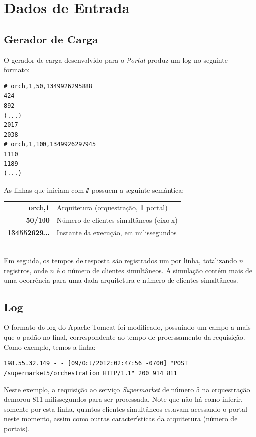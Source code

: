 \documentclass[brazil, a4paper,12pt]{article}
\begin{document}
\section{Dados de Entrada}

\subsection{Gerador de Carga}
O gerador de carga desenvolvido para o \emph{Portal} produz um log no seguinte formato:

\begin{verbatim}
# orch,1,50,1349926295888
424
892
(...)
2017
2038
# orch,1,100,1349926297945
1110
1189
(...)
\end{verbatim}

As linhas que iniciam com \verb/#/ possuem a seguinte semântica:\\

\begin{tabular}{r l}
  {\bf orch,1} & Arquitetura (orquestração, {\bf1} portal)\\
  {\bf 50/100} & Número de clientes simultâneos (eixo x)\\
  {\bf 134552629...} & Instante da execução, em milissegundos
\end{tabular}
\\

Em seguida, os tempos de resposta são registrados um por linha, totalizando $n$ registros, onde $n$ é o número de clientes simultâneos. A simulação contém mais de uma ocorrência para uma dada arquitetura e número de clientes simultâneos.

\subsection{Log}
  O formato do log do Apache Tomcat foi modificado, possuindo um campo a mais que o padão no final, correspondente ao tempo de processamento da requisição. Como exemplo, temos a linha:

\begin{verbatim}
198.55.32.149 - - [09/Oct/2012:02:47:56 -0700] "POST
/supermarket5/orchestration HTTP/1.1" 200 914 811
\end{verbatim}

Neste exemplo, a requisição ao serviço \emph{Supermarket} de número 5 na orquestração demorou 811 milissegundos para ser processada. Note que não há como inferir, somente por esta linha, quantos clientes simultâneos estavam acessando o portal neste momento, assim como outras características da arquitetura (número de portais).
\end{document}
